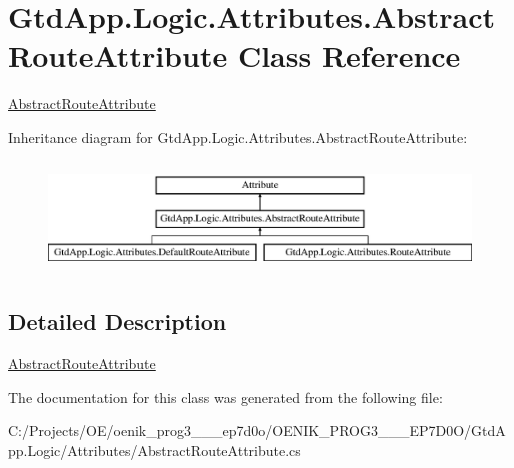 \hypertarget{class_gtd_app_1_1_logic_1_1_attributes_1_1_abstract_route_attribute}{}\section{Gtd\+App.\+Logic.\+Attributes.\+Abstract\+Route\+Attribute Class Reference}
\label{class_gtd_app_1_1_logic_1_1_attributes_1_1_abstract_route_attribute}


\mbox{\hyperlink{class_gtd_app_1_1_logic_1_1_attributes_1_1_abstract_route_attribute}{Abstract\+Route\+Attribute}}  


Inheritance diagram for Gtd\+App.\+Logic.\+Attributes.\+Abstract\+Route\+Attribute\+:\begin{figure}[H]
\begin{center}
\leavevmode
\includegraphics[height=2.957747cm]{class_gtd_app_1_1_logic_1_1_attributes_1_1_abstract_route_attribute}
\end{center}
\end{figure}


\subsection{Detailed Description}
\mbox{\hyperlink{class_gtd_app_1_1_logic_1_1_attributes_1_1_abstract_route_attribute}{Abstract\+Route\+Attribute}} 



The documentation for this class was generated from the following file\+:\begin{DoxyCompactItemize}
\item 
C\+:/\+Projects/\+O\+E/oenik\+\_\+prog3\+\_\+\_\+\_\+ep7d0o/\+O\+E\+N\+I\+K\+\_\+\+P\+R\+O\+G3\+\_\+\_\+\_\+\+E\+P7\+D0\+O/\+Gtd\+App.\+Logic/\+Attributes/Abstract\+Route\+Attribute.\+cs\end{DoxyCompactItemize}
